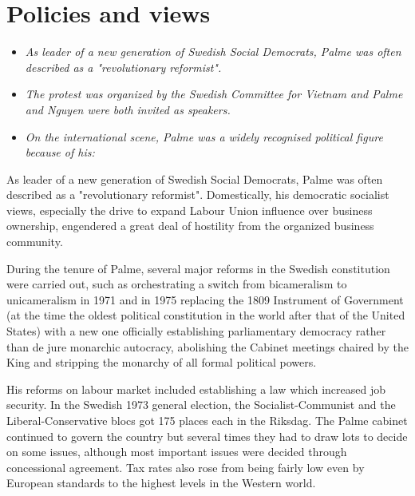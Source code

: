 \section{Policies and views}\label{policies-and-views}

\begin{itemize}
\item
  \emph{As leader of a new generation of Swedish Social Democrats, Palme
  was often described as a "revolutionary reformist".}
\item
  \emph{The protest was organized by the Swedish Committee for Vietnam
  and Palme and Nguyen were both invited as speakers.}
\item
  \emph{On the international scene, Palme was a widely recognised
  political figure because of his:}
\end{itemize}

As leader of a new generation of Swedish Social Democrats, Palme was
often described as a "revolutionary reformist". Domestically, his
democratic socialist views, especially the drive to expand Labour Union
influence over business ownership, engendered a great deal of hostility
from the organized business community.

During the tenure of Palme, several major reforms in the Swedish
constitution were carried out, such as orchestrating a switch from
bicameralism to unicameralism in 1971 and in 1975 replacing the 1809
Instrument of Government (at the time the oldest political constitution
in the world after that of the United States) with a new one officially
establishing parliamentary democracy rather than de jure monarchic
autocracy, abolishing the Cabinet meetings chaired by the King and
stripping the monarchy of all formal political powers.

His reforms on labour market included establishing a law which increased
job security. In the Swedish 1973 general election, the
Socialist-Communist and the Liberal-Conservative blocs got 175 places
each in the Riksdag. The Palme cabinet continued to govern the country
but several times they had to draw lots to decide on some issues,
although most important issues were decided through concessional
agreement. Tax rates also rose from being fairly low even by European
standards to the highest levels in the Western world.

